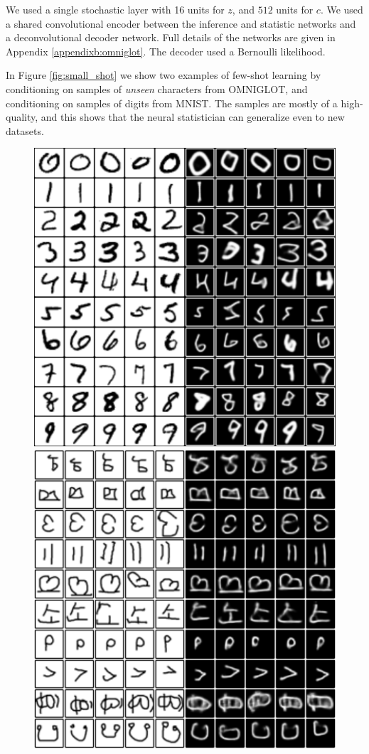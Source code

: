 \documentclass{article} %
\begin{document}
We used a single stochastic layer with 16 units for $z$, and $512$ units for $c$. We used a shared convolutional encoder between the inference and statistic networks and a deconvolutional decoder network. Full details of the networks are given in Appendix \ref{appendixb:omniglot}. The decoder used a Bernoulli likelihood. 

In Figure \ref{fig:small_shot} we show two examples of few-shot learning by conditioning on samples of \emph{unseen} characters from OMNIGLOT, and conditioning on samples of digits from MNIST. The  samples are mostly of a high-quality, and this shows that the neural statistician can generalize even to new datasets. 

\begin{figure}
\begin{minipage}{0.5\textwidth}
\centering
\includegraphics[scale=0.5]{small_shot_mnist.png}
\end{minipage}
\begin{minipage}{0.5\textwidth}
\centering
\includegraphics[scale=0.5]{best_cond_5_shot_omniglot.png}

\end{minipage}
\end{figure}
\end{document}
